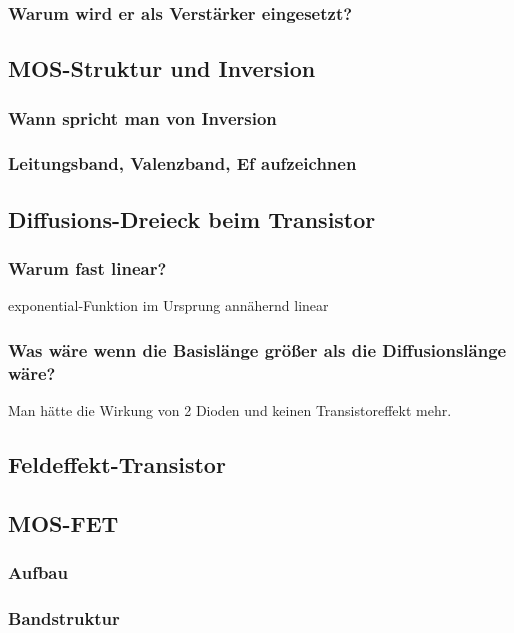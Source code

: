 \documentclass{article}
\begin{document}
    \subsubsection{Warum wird er als Verst\"arker eingesetzt?}
\subsection{MOS-Struktur und Inversion }\label{k6:mosInversion}

    \subsubsection{Wann spricht man von Inversion}
    \subsubsection{Leitungsband, Valenzband, Ef aufzeichnen}

\subsection{Diffusions-Dreieck beim Transistor }\label{k6:diffusionsdreieck}
    \subsubsection{Warum fast linear?} exponential-Funktion im Ursprung ann\"ahernd linear
    \subsubsection{Was w\"are wenn die Basisl\"ange gr\"o{\ss}er als die Diffusionsl\"ange w\"are?} Man h\"atte die Wirkung von 2 Dioden und keinen Transistoreffekt mehr.

\subsection{Feldeffekt-Transistor }\label{k6:fet}

\subsection{MOS-FET }\label{k6:mosfet}
    \subsubsection{Aufbau}
    \subsubsection{Bandstruktur}
\end{document}
